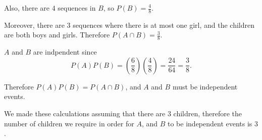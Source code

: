 \documentclass[a4paper,11pt]{article}
\begin{document}
Also, there are $4$ sequences in $B$, so $P\left( B \right) = \frac{4}{8}$. 

Moreover, there are $3$ sequences where there is at most one girl, and
the children are both boys and girls.  Therefore $P\left( A \cap B \right) = \frac{3}{8}$.

$A$ and $B$ are indpendent since
\begin{equation}
P\left(A \right) P \left( B \right)
  = \left( \frac{6}{8} \right) \left( \frac{4}{8} \right)
  = \frac{24}{64} = \frac{3}{8}.
\end{equation}

Therefore $P\left(A \right) P\left(B \right) = P \left(A \cap B \right)$,
and $A$ and $B$ must be independent events.

We made these calculations assuming that there are $3$ children,
therefore the number of children we require in order for $A$, and
$B$ to be independent events is $3$.
\printbibliography{}
\end{document}
